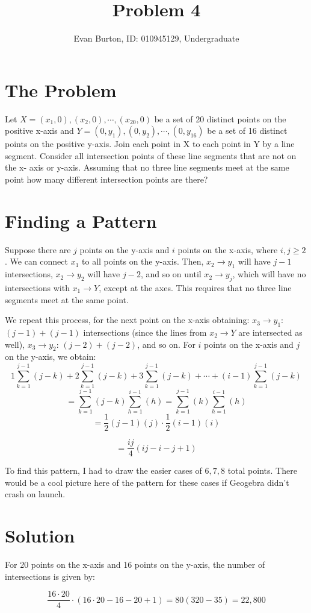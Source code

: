 \documentclass[]{article}
\title{Problem 4}
\author{Evan Burton, ID: 010945129, Undergraduate}
\begin{document}
\maketitle

\section{The Problem}
Let $X = (x_1,0), (x_2,0), \cdots , (x_{20},0)$ be a set of 20 distinct points on the positive x-axis and $Y = (0,y_1), (0,y_2), \cdots , (0,y_{16})$ be a set of 16 distinct points on the positive y-axis.  Join each point in X to each point in Y by a line segment.  Consider all intersection points of these line segments that are not on the x- axis or y-axis.  Assuming that no three line segments meet at the same point how many different intersection points are there? 

\section{Finding a Pattern}
Suppose there are $j$ points on the y-axis and $i$ points on the x-axis, where $i,j \geq 2$. We can connect $x_1$ to all points on the y-axis. Then, $x_2 \rightarrow y_1$ will have $j-1$ intersections, $x_2 \rightarrow y_2$ will have $j-2$, and so on until $x_2 \rightarrow y_j$, which will have no intersections with $x_1 \rightarrow Y$, except at the axes. This requires that no three line segments meet at the same point.

We repeat this process, for the next point on the x-axis obtaining: $x_3 \rightarrow y_1$: $(j-1)+(j-1)$ intersections (since the lines from $x_2\rightarrow Y$ are intersected as well), $x_3 \rightarrow y_2$: $(j-2)+(j-2)$, and so on. For $i$ points on the x-axis and $j$ on the y-axis, we obtain:
$$1\sum_{k=1}^{j-1}(j-k) + 2\sum_{k=1}^{j-1}(j-k) + 3\sum_{k=1}^{j-1}(j-k) + \cdots + (i-1)\sum_{k=1}^{j-1}(j-k)$$
$$=\sum_{k=1}^{j-1}(j-k)\sum_{h=1}^{i-1}(h) 
= \sum_{k=1}^{j-1}(k)\sum_{h=1}^{i-1}(h)
$$
$$
= \frac{1}{2}(j-1)(j)\cdot \frac{1}{2}(i-1)(i)$$

$$=\frac{ij}{4}(ij-i-j+1)$$

To find this pattern, I had to draw the easier cases of $6,7,8$ total points. There would be a cool picture here of the pattern for these cases if Geogebra didn't crash on launch.

\section{Solution}
For 20 points on the x-axis and 16 points on the y-axis, the number of intersections is given by:

$$\frac{16\cdot 20}{4}\cdot(16\cdot 20 - 16 - 20 + 1)
= 80(320 - 35) = 22,800
$$
\end{document}
